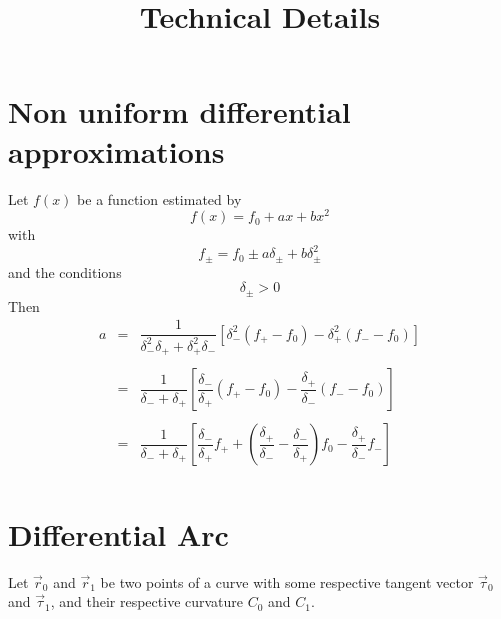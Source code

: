 \documentclass[11pt]{amsart}
\title{Technical Details}
\begin{document}
\maketitle

\section{Non uniform differential approximations}

Let $f(x)$ be a function estimated by
\[
	f(x) = f_0 + ax + b x^2
\]
with
\[
	f_\pm = f_0 \pm a \delta_\pm + b \delta_\pm^2
\]
and the conditions
\[
	\delta_\pm > 0 %
\]
Then
\[
\begin{array}{rcl}
	a & = &
	\dfrac{1}{\delta_-^2\delta_+ + \delta_+^2\delta_-}
	\left[ 
	   \delta_-^2\left(f_+ - f_0 \right)
	 - \delta_+^2\left(f_- - f_0 \right)
	\right] \\
	\\
	& = & \dfrac{1}{\delta_- + \delta_+} 
	\left[
	 \dfrac{\delta_-}{\delta_+} \left(f_+ - f_0 \right)
	-\dfrac{\delta_+}{\delta_-} \left(f_- - f_0 \right)
	\right] \\
	\\
	& = & \dfrac{1}{\delta_- + \delta_+} 
	\left[
	\dfrac{\delta_-}{\delta_+} f_+
	+\left(\dfrac{\delta_+}{\delta_-} - \dfrac{\delta_-}{\delta_+}\right) f_0
	-\dfrac{\delta_+}{\delta_-} f_-
	\right]\\
\end{array}
\]

\section{Differential Arc}
Let $\vec{r}_0$ and $\vec{r}_1$ be two points of a curve
with some respective tangent vector $\vec{\tau}_0$ and $\vec{\tau}_1$, and their
respective curvature $C_0$ and $C_1$.
\end{document}
